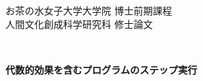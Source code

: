 
\begin{titlepage}
\setlength{\baselineskip}{13mm}
\parbox{\hsize}{
\vspace*{10mm}

\hspace*{\fill}
{\Large お茶の水女子大学大学院 博士前期課程
\vspace*{3mm}
\hspace*{\fill}\\\hspace*{\fill}
人間文化創成科学研究科 修士論文\hspace*{\fill}}}\\
\vspace*{13mm}

\begin{center}
  \textbf{\huge \textbf{
      代数的効果を含むプログラムのステップ実行}}
  \vspace*{25mm}
  
  \begin{figure}[htp]
    \begin{center}
    \end{center}
  \end{figure}
  \vspace*{25mm}
  

\end{center}
\end{titlepage}
